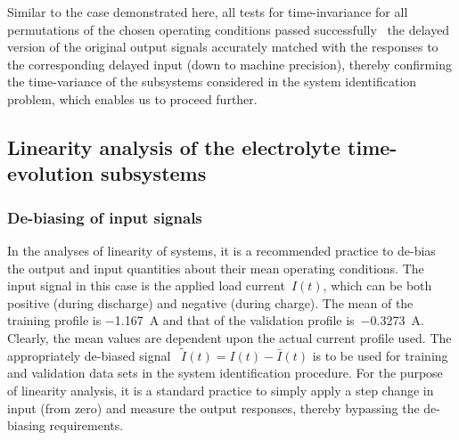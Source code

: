 Similar to  the case demonstrated  here, all  tests for time-invariance  for all
permutations of  the chosen operating  conditions passed successfully  \ie~the
delayed  version of  the original  output  signals accurately  matched with  the
responses  to  the corresponding  delayed  input  (down to  machine  precision),
thereby confirming the time-variance of  the subsystems considered in the system
identification problem, which enables us to proceed further.


\subsection{Linearity analysis of the electrolyte time-evolution subsystems}\label{subsec:linearityanalysis}

\subsubsection*{De-biasing of  input signals}

In the analyses of linearity of systems, it is a recommended practice to de-bias
the output and input quantities about their mean operating conditions. The input
signal  in this  case is  the  applied load  current~$I(t)$, which  can be  both
positive  (during discharge)  and  negative  (during charge).  The  mean of  the
training  profile is  \SI{-1.167}{\ampere} and  that of  the validation  profile
is~\SI{-0.3273}{\ampere}. Clearly, the mean values are dependent upon the actual
current profile used. The appropriately de-biased signal \ie~$\widetilde{I}(t) =
I(t) - \bar{I}(t)$  is to be used  for training and validation data  sets in the
system identification procedure. For the purpose  of linearity analysis, it is a
standard practice to simply apply a step change in input (from zero) and measure
the output responses, thereby bypassing the de-biasing requirements.


